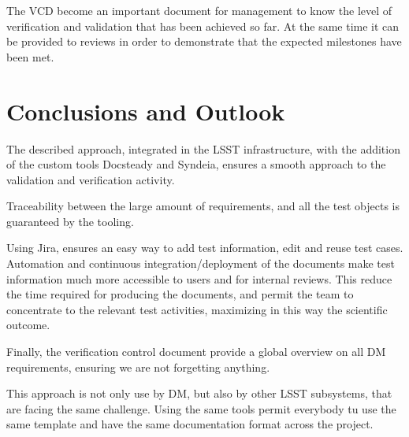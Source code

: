 The VCD become an important document for management to know the level of verification and validation that has been achieved so far.
At the same time it can be provided to reviews in order to demonstrate that the expected milestones have been met.








\section{Conclusions and Outlook}

The described approach, integrated in the LSST infrastructure, with the addition of the custom tools Docsteady and Syndeia, 
ensures a smooth approach to the validation and verification activity. 

Traceability between the large amount of requirements, and all the test objects is guaranteed by the tooling.

Using Jira, ensures an easy way to add test information, edit and reuse test cases.
Automation and continuous integration/deployment of the documents make test information much more accessible to users and for internal reviews.
This reduce the time required for producing the documents, and permit the team to concentrate to the relevant test activities, maximizing in this way the scientific outcome.

Finally, the verification control document provide a global overview on all DM requirements, ensuring we are not forgetting anything.

This approach is not only use by DM, but also by other LSST subsystems, that are facing the same challenge.
Using the same tools permit everybody tu use the same template and have the same documentation format across the project.



